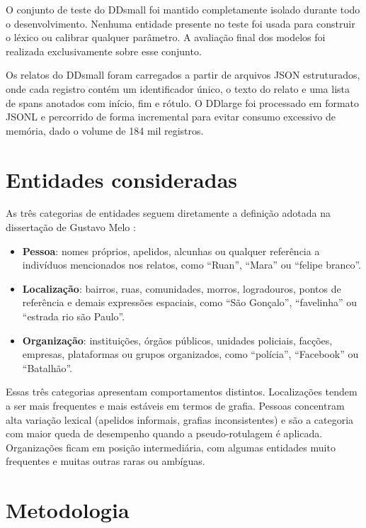 \documentclass[12pt,a4paper]{article}
\begin{document}
O conjunto de teste do DDsmall foi mantido completamente isolado durante todo o
desenvolvimento. Nenhuma entidade presente no teste foi usada para construir o
léxico ou calibrar qualquer parâmetro. A avaliação final dos modelos foi realizada
exclusivamente sobre esse conjunto.

Os relatos do DDsmall foram carregados a partir de arquivos JSON estruturados,
onde cada registro contém um identificador único, o texto do relato e uma lista
de spans anotados com início, fim e rótulo. O DDlarge foi processado em formato
JSONL e percorrido de forma incremental para evitar consumo excessivo de memória,
dado o volume de 184 mil registros.

\section{Entidades consideradas}

As três categorias de entidades seguem diretamente a definição adotada na
dissertação de Gustavo Melo \citep{melo2026ren}:

\begin{itemize}
  \item \textbf{Pessoa}: nomes próprios, apelidos, alcunhas ou qualquer referência
    a indivíduos mencionados nos relatos, como ``Ruan'', ``Mara'' ou ``felipe branco''.
  \item \textbf{Localização}: bairros, ruas, comunidades, morros, logradouros,
    pontos de referência e demais expressões espaciais, como ``São Gonçalo'',
    ``favelinha'' ou ``estrada rio são Paulo''.
  \item \textbf{Organização}: instituições, órgãos públicos, unidades policiais,
    facções, empresas, plataformas ou grupos organizados, como ``polícia'',
    ``Facebook'' ou ``Batalhão''.
\end{itemize}

Essas três categorias apresentam comportamentos distintos. Localizações tendem a
ser mais frequentes e mais estáveis em termos de grafia. Pessoas concentram alta
variação lexical (apelidos informais, grafias inconsistentes) e são a categoria
com maior queda de desempenho quando a pseudo-rotulagem é aplicada. Organizações
ficam em posição intermediária, com algumas entidades muito frequentes e muitas
outras raras ou ambíguas.

\section{Metodologia}
\end{document}
